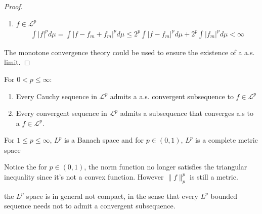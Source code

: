 \begin{proof}
\begin{itemize}
\begin{enumerate}
\begin{align*}
			\end{align*}
			Since the sequence and the subsequence are $L^p$ convergent, we have that: $\liminf_k \int |f_{n_k} - f_m|^p d\mu \rightarrow 0$
			\item $f \in \mathcal{L}^p$
			\begin{align*}
				\int |f|^p d\mu = \int |f -f_m + f_m|^p d\mu 
				\leq 2^p \int |f-f_m|^p d\mu + 2^p \int |f_m|^p d\mu < \infty
			\end{align*}
		\end{enumerate}
	\end{itemize}
	The monotone convergence theory could be used to ensure the existence of a a.s. limit.
\end{proof}
	
\begin{corollary}[H.Weyl]
	For $0 < p \leq \infty$:
	\begin{enumerate}
		\item Every Cauchy sequence in $\mathcal{L}^p$ admits a a.s. convergent subsequence to $ f \in \mathcal{L}^p$
		\item Every convergent sequence in $\mathcal{L}^p$ admits a subsequence that converges a.s to a $f \in \mathcal{L}^p$.
	\end{enumerate}
\end{corollary}
	
\begin{corollary}
	For $1 \leq p \leq \infty$, $L^p$ is a Banach space and for $p \in (0, 1)$, $L^p$ is a complete metric space
\end{corollary}
\begin{remark}
Notice the for $p \in (0, 1)$, the norm function no longer satisfies the triangular inequality since it's not a convex function.	However $\|f\|_p^p$ is still a metric.
\end{remark}

\begin{example}
\end{example}

\begin{example}
	the $L^p$ space is in general not compact, in the sense that every $L^p$ bounded sequence needs not to admit a convergent subsequence.
\end{example}

